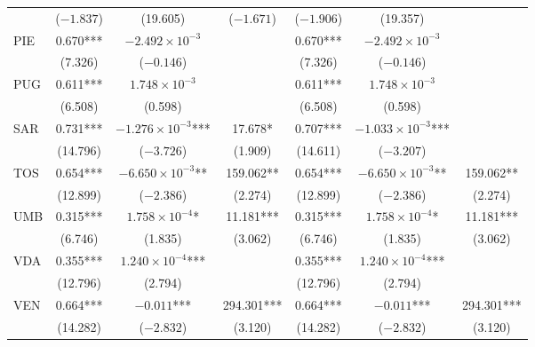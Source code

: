\documentclass[12pt]{article}
\begin{document}
\begin{appendices}
\begin{longtable}{@{}lcccccc@{}}
             & ($-1.837$) & (19.605) & ($-1.671$) & ($-1.906$) & (19.357) &  \\ 
            PIE & 0.670*** & $-2.492 \times 10^{-3}$ &  & 0.670*** & $-2.492 \times 10^{-3}$ &  \\ 
             & (7.326) & ($-0.146$) &  & (7.326) & ($-0.146$) &  \\ 
            PUG & 0.611*** & $1.748 \times 10^{-3}$ &  & 0.611*** & $1.748 \times 10^{-3}$ &  \\ 
             & (6.508) & (0.598) &  & (6.508) & (0.598) &  \\ 
            SAR & 0.731*** & $-1.276 \times 10^{-3}$*** & 17.678* & 0.707*** & $-1.033 \times 10^{-3}$*** &  \\ 
             & (14.796) & ($-3.726$) & (1.909) & (14.611) & ($-3.207$) &  \\ 
            TOS & 0.654*** & $-6.650 \times 10^{-3}$** & 159.062** & 0.654*** & $-6.650 \times 10^{-3}$** & 159.062** \\ 
             & (12.899) & ($-2.386$) & (2.274) & (12.899) & ($-2.386$) & (2.274) \\ 
            UMB & 0.315*** & $1.758 \times 10^{-4}$* & 11.181*** & 0.315*** & $1.758 \times 10^{-4}$* & 11.181*** \\ 
             & (6.746) & (1.835) & (3.062) & (6.746) & (1.835) & (3.062) \\ 
            VDA & 0.355*** & $1.240 \times 10^{-4}$*** &  & 0.355*** & $1.240 \times 10^{-4}$*** &  \\ 
             & (12.796) & (2.794) &  & (12.796) & (2.794) &  \\ 
            VEN & 0.664*** & $-0.011$*** & 294.301*** & 0.664*** & $-0.011$*** & 294.301*** \\ 
             & (14.282) & ($-2.832$) & (3.120) & (14.282) & ($-2.832$) & (3.120) \\* \bottomrule
    	\end{longtable}
		
        
        

\end{appendices}
\end{document}
